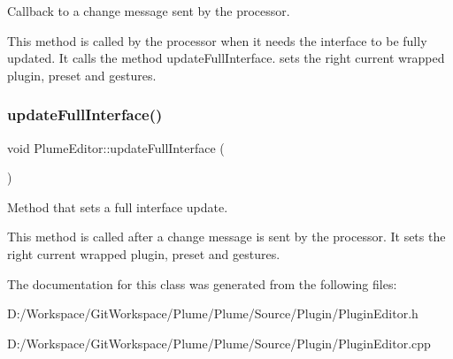Callback to a change message sent by the processor. 

This method is called by the processor when it needs the interface to be fully updated. It calls the method update\+Full\+Interface. sets the right current wrapped plugin, preset and gestures. \mbox{\label{class_plume_editor_acddc96d095aeb53f7a4ee6cf1f3265e6}} 
\subsubsection{\texorpdfstring{update\+Full\+Interface()}{updateFullInterface()}}
{\footnotesize\ttfamily void Plume\+Editor\+::update\+Full\+Interface (\begin{DoxyParamCaption}{ }\end{DoxyParamCaption})}



Method that sets a full interface update. 

This method is called after a change message is sent by the processor. It sets the right current wrapped plugin, preset and gestures. 

The documentation for this class was generated from the following files\+:\begin{DoxyCompactItemize}
\item 
D\+:/\+Workspace/\+Git\+Workspace/\+Plume/\+Plume/\+Source/\+Plugin/Plugin\+Editor.\+h\item 
D\+:/\+Workspace/\+Git\+Workspace/\+Plume/\+Plume/\+Source/\+Plugin/Plugin\+Editor.\+cpp\end{DoxyCompactItemize}
